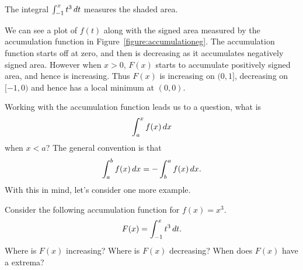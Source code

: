 \begin{marginfigure}
\caption{The integral $\int_{-1}^x t^3 \, d t$ measures the shaded area.}
\label{figure:accumulationeg}
\end{marginfigure}

\begin{solution}
We can see a plot of $f(t)$ along with the signed area measured by the
accumulation function in Figure~\ref{figure:accumulationeg}. The
accumulation function starts off at zero, and then is decreasing as it
accumulates negatively signed area. However when $x>0$, $F(x)$ starts
to accumulate positively signed area, and hence is increasing. Thus
$F(x)$ is increasing on $(0,1]$, decreasing on $[-1,0)$ and hence has
a local minimum at $(0,0)$.
\end{solution}

Working with the accumulation function leads us to a question, what is  
\[
\int_a^x f(x) \, d x
\]
when $x< a$? The general convention is that 
\[
\int_a^b f(x) \, d x = -\int_b^a f(x) \, d x. 
\]
With this in mind, let's consider one more example.


\begin{example} 
Consider the following accumulation function for $f(x) = x^3$.
\[
F(x) = \int_{-1}^x t^3 \, d t.
\]
Where is $F(x)$ increasing? Where is $F(x)$ decreasing? When does
$F(x)$ have a extrema?
\end{example}

